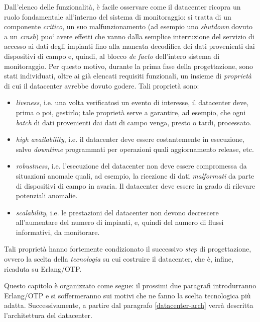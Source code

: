 %
Dall'elenco delle funzionalit\`a, \`e facile osservare come il
datacenter ricopra un ruolo fondamentale all'interno del sistema di monitoraggio: 
si tratta di un componente \emph{critico}, un suo malfunzionamento 
(ad esempio uno \emph{shutdown} dovuto a un \emph{crash}) puo` avere effetti che 
vanno dalla semplice interruzione del servizio di accesso ai dati degli impianti 
fino alla mancata decodifica dei dati provenienti dai dispositivi di campo e, 
quindi, al blocco \emph{de facto} dell'intero sistema di monitoraggio.
%
Per questo motivo, durante la prima fase della progettazione, sono stati 
individuati, oltre ai gi\`a elencati requisiti funzionali, un insieme di 
\emph{propriet\`a} di cui il datacenter avrebbe dovuto godere. Tali propriet\`a 
sono:
%
\begin{itemize}
\item \emph{liveness}, i.e. una volta verificatosi un evento di interesse, 
il datacenter deve, prima o poi, gestirlo; tale propriet\`a serve a garantire, ad 
esempio, che ogni \emph{batch} di dati provenienti dai dati di campo venga, 
presto o tardi, processato.
%
\item \emph{high availability}, i.e. il datacenter deve essere costantemente 
in esecuzione, salvo \emph{downtime} programmati per operazioni quali 
aggiornamento release, etc.
%
\item \emph{robustness}, i.e. l'esecuzione del datacenter non deve essere 
compromessa da situazioni anomale quali, ad esempio, la ricezione di dati 
\emph{malformati} da parte di dispositivi di campo in avaria. Il datacenter 
deve essere in grado di rilevare potenziali anomalie.%
%
\item \emph{scalability}, i.e. le prestazioni del datacenter non devono 
decrescere all'aumentare del numero di impianti, e, quindi del numero di 
flussi informativi, da monitorare. %
%
\end{itemize}
%

%
Tali propriet\`a hanno fortemente condizionato il successivo \emph{step} di
progettazione, ovvero la scelta della \emph{tecnologia} su cui costruire il 
datacenter, che \`e, infine, ricaduta su Erlang/OTP.
%

%
Questo capitolo \`e organizzato come segue: il prossimi due paragrafi
introdurranno Erlang/OTP e si soffermeranno sui motivi che ne fanno la scelta %
tecnologica pi\`u adatta. Successivamente, a partire dal paragrafo 
\ref{datacenter-arch} verr\`a descritta l'architettura del datacenter.
%

